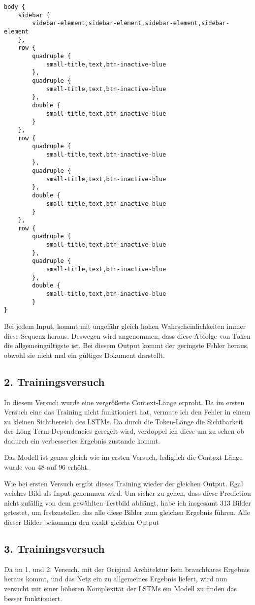 \documentclass[pdftex,a4paper,halfparskip]{scrartcl}
\begin{document}
\begin{verbatim}
body {
	sidebar {
		sidebar-element,sidebar-element,sidebar-element,sidebar-element
	},
	row {
		quadruple {
			small-title,text,btn-inactive-blue
		},
		quadruple {
			small-title,text,btn-inactive-blue
		},
		double {
			small-title,text,btn-inactive-blue
		}
	},
	row {
		quadruple {
			small-title,text,btn-inactive-blue
		},
		quadruple {
			small-title,text,btn-inactive-blue
		},
		double {
			small-title,text,btn-inactive-blue
		}
	},
	row {
		quadruple {
			small-title,text,btn-inactive-blue
		},
		quadruple {
			small-title,text,btn-inactive-blue
		},
		double {
			small-title,text,btn-inactive-blue
		}
}
\end{verbatim}

Bei jedem Input, kommt mit ungefähr gleich hohen Wahrscheinlichkeiten immer diese Sequenz heraus. Deswegen wird angenommen, dass diese Abfolge von Token die allgemeingültigste ist. Bei diesem Output kommt der geringste Fehler heraus, obwohl sie nicht mal ein gültiges Dokument darstellt.

\subsection{2. Trainingsversuch}

In diesem Versuch wurde eine vergrößerte Context-Länge erprobt. Da im ersten Versuch eine das Training nicht funktioniert hat, vermute ich den Fehler in einem zu kleinen Sichtbereich des LSTMs. Da durch die Token-Länge die Sichtbarkeit der Long-Term-Dependencies geregelt wird, verdoppel ich diese um zu sehen ob dadurch ein verbessertes Ergebnis zustande kommt. 

Das Modell ist genau gleich wie im ersten Versuch, lediglich die Context-Länge wurde von 48 auf 96 erhöht.

Wie bei ersten Versuch ergibt dieses Training wieder der gleichen Output. Egal welches Bild als Input genommen wird. Um sicher zu gehen, dass diese Prediction nicht zufällig von dem gewählten Testbild abhängt, habe ich insgesamt 313 Bilder getestet, um festzustellen das alle diese Bilder zum gleichen Ergebnis führen. Alle dieser Bilder bekommen den exakt gleichen Output

\subsection{3. Trainingsversuch}

Da im 1. und 2. Versuch, mit der Original Architektur kein brauchbares Ergebnis heraus kommt, und das Netz ein zu allgemeines Ergebnis liefert, wird nun versucht mit einer höheren Komplexität der LSTMs ein Modell zu finden das besser funktioniert.
\end{document}
